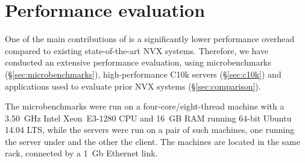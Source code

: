 \section{Performance evaluation}
\label{sec:evaluation}

One of the main contributions of \varan is a significantly lower
performance overhead compared to existing state-of-the-art NVX
systems.  Therefore, we have conducted an extensive performance
evaluation, using microbenchmarks (\S\ref{sec:microbenchmarks}),
high-performance C10k servers (\S\ref{sec:c10k}) and applications used to
evaluate prior NVX systems (\S\ref{sec:comparison}).

The microbenchmarks were run on a four-core/eight-thread machine with
a 3.50~GHz Intel Xeon~E3-1280 CPU and 16~GB RAM running 64-bit Ubuntu
14.04 LTS, while the servers were run on a pair of such machines, one
running the server under \varan and the other the client.  The machines
are located in the same rack, connected by a 1~Gb Ethernet link.




